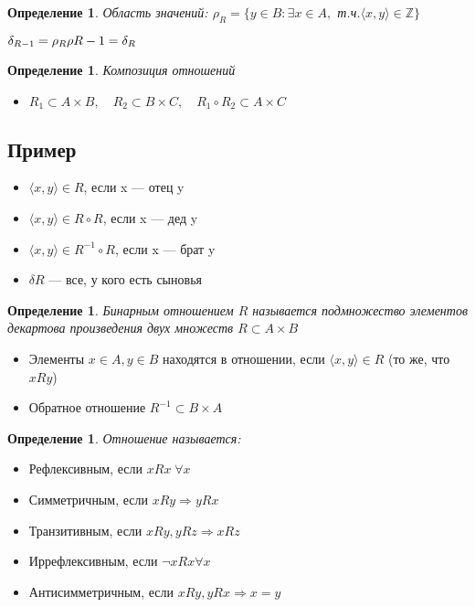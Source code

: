 \documentclass[12pt,letterpaper]{report}
\newtheorem{conj}[theorem]{Определение}
\begin{document}
\begin{conj} 
    Область значений: 
    $\rho_{R} = \{y \in B: \exists x \in A, $ т.ч.$ \langle x, y \rangle  \in \mathbb{Z} \} $ 
\end{conj}
$\delta_{R-1} = \rho_{R} \\
\rho{R-1} = \delta_{R}$

\begin{conj} 
    Композиция отношений 
\end{conj}

\begin{itemize}
    \item[] $R_1 \subset A \times B, \quad R_2 \subset B \times C, \quad R_1 \circ R_2 \subset A \times C$
\end{itemize}
\subsection*{Пример}
\begin{itemize}
    \item $\langle x, y \rangle \in R$, если x — отец y
    \item $\langle x, y \rangle \in R \circ R$, если x — дед y
    \item $\langle x, y \rangle \in R^{-1} \circ R$, если x — брат y
    \item $\delta R$ — все, у кого есть сыновья
\end{itemize}
\begin{conj} 
    Бинарным отношением $R$ называется подмножество элементов декартова произведения двух
    множеств $R \subset A \times B$
\end{conj}

\begin{itemize}
    \item[] Элементы $x \in A, y \in B$ находятся в отношении, если $  \langle x, y \rangle \in R $ (то же, что $xRy$)
    \item[] Обратное отношение $R^{-1} \subset B \times A$ 
\end{itemize}

\begin{conj}
    Отношение называется:
\end{conj}
\begin{itemize}
    \item Рефлексивным, если $xRx \; \forall x$
    \item Симметричным, если $xRy \Longrightarrow yRx$
    \item Транзитивным, если $xRy, yRz \Longrightarrow xRz$
    \item Иррефлексивным, если $\neg xRx \forall x$
    \item Антисимметричным, если $xRy, yRx \Longrightarrow x = y$
\end{itemize}
\end{document}
